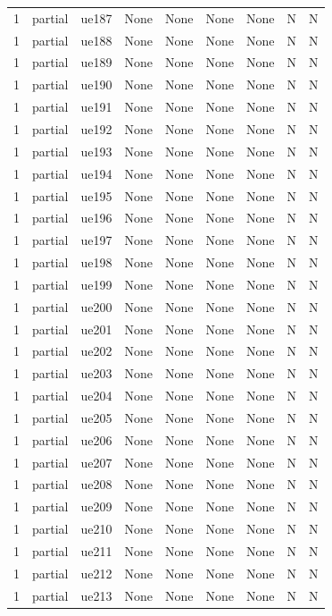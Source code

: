 \begin{table}[ht]
\begin{tabular}{|c|c|c|c|c|c|c|c|c|}
1 & partial & ue187 & None & None & None & None & N & N \\
1 & partial & ue188 & None & None & None & None & N & N \\
1 & partial & ue189 & None & None & None & None & N & N \\
1 & partial & ue190 & None & None & None & None & N & N \\
1 & partial & ue191 & None & None & None & None & N & N \\
1 & partial & ue192 & None & None & None & None & N & N \\
1 & partial & ue193 & None & None & None & None & N & N \\
1 & partial & ue194 & None & None & None & None & N & N \\
1 & partial & ue195 & None & None & None & None & N & N \\
1 & partial & ue196 & None & None & None & None & N & N \\
1 & partial & ue197 & None & None & None & None & N & N \\
1 & partial & ue198 & None & None & None & None & N & N \\
1 & partial & ue199 & None & None & None & None & N & N \\
1 & partial & ue200 & None & None & None & None & N & N \\
1 & partial & ue201 & None & None & None & None & N & N \\
1 & partial & ue202 & None & None & None & None & N & N \\
1 & partial & ue203 & None & None & None & None & N & N \\
1 & partial & ue204 & None & None & None & None & N & N \\
1 & partial & ue205 & None & None & None & None & N & N \\
1 & partial & ue206 & None & None & None & None & N & N \\
1 & partial & ue207 & None & None & None & None & N & N \\
1 & partial & ue208 & None & None & None & None & N & N \\
1 & partial & ue209 & None & None & None & None & N & N \\
1 & partial & ue210 & None & None & None & None & N & N \\
1 & partial & ue211 & None & None & None & None & N & N \\
1 & partial & ue212 & None & None & None & None & N & N \\
1 & partial & ue213 & None & None & None & None & N & N \\

\end{tabular}
\end{table}
